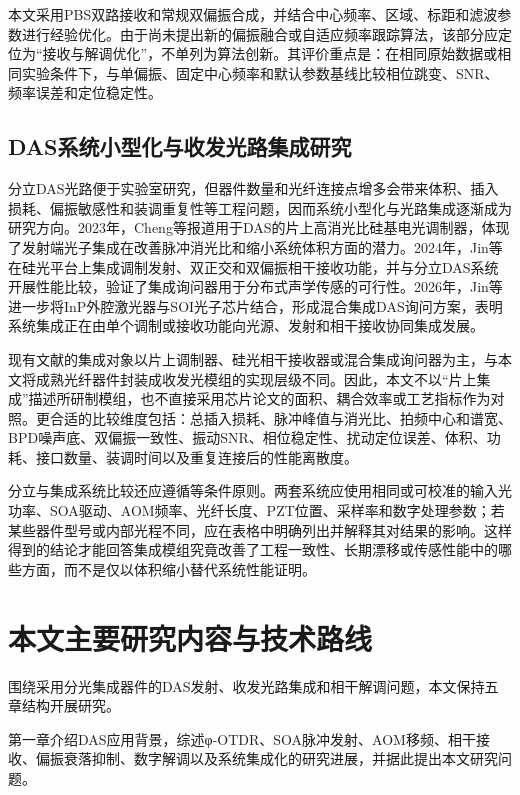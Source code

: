 本文采用PBS双路接收和常规双偏振合成，并结合中心频率、区域、标距和滤波参数进行经验优化。由于尚未提出新的偏振融合或自适应频率跟踪算法，该部分应定位为“接收与解调优化”，不单列为算法创新。其评价重点是：在相同原始数据或相同实验条件下，与单偏振、固定中心频率和默认参数基线比较相位跳变、SNR、频率误差和定位稳定性。

\subsection{DAS系统小型化与收发光路集成研究}

分立DAS光路便于实验室研究，但器件数量和光纤连接点增多会带来体积、插入损耗、偏振敏感性和装调重复性等工程问题，因而系统小型化与光路集成逐渐成为研究方向。2023年，Cheng等报道用于DAS的片上高消光比硅基电光调制器，体现了发射端光子集成在改善脉冲消光比和缩小系统体积方面的潜力\cite{cheng2023onchip}。2024年，Jin等在硅光平台上集成调制发射、双正交和双偏振相干接收功能，并与分立DAS系统开展性能比较，验证了集成询问器用于分布式声学传感的可行性\cite{jin2024integrated}。2026年，Jin等进一步将InP外腔激光器与SOI光子芯片结合，形成混合集成DAS询问方案，表明系统集成正在由单个调制或接收功能向光源、发射和相干接收协同集成发展\cite{jin2026hybrid}。

现有文献的集成对象以片上调制器、硅光相干接收器或混合集成询问器为主，与本文将成熟光纤器件封装成收发光模组的实现层级不同。因此，本文不以“片上集成”描述所研制模组，也不直接采用芯片论文的面积、耦合效率或工艺指标作为对照。更合适的比较维度包括：总插入损耗、脉冲峰值与消光比、拍频中心和谱宽、BPD噪声底、双偏振一致性、振动SNR、相位稳定性、扰动定位误差、体积、功耗、接口数量、装调时间以及重复连接后的性能离散度。

分立与集成系统比较还应遵循等条件原则。两套系统应使用相同或可校准的输入光功率、SOA驱动、AOM频率、光纤长度、PZT位置、采样率和数字处理参数；若某些器件型号或内部光程不同，应在表格中明确列出并解释其对结果的影响。这样得到的结论才能回答集成模组究竟改善了工程一致性、长期漂移或传感性能中的哪些方面，而不是仅以体积缩小替代系统性能证明。

\section{本文主要研究内容与技术路线}

围绕采用分光集成器件的DAS发射、收发光路集成和相干解调问题，本文保持五章结构开展研究。

第一章介绍DAS应用背景，综述φ-OTDR、SOA脉冲发射、AOM移频、相干接收、偏振衰落抑制、数字解调以及系统集成化的研究进展，并据此提出本文研究问题。

